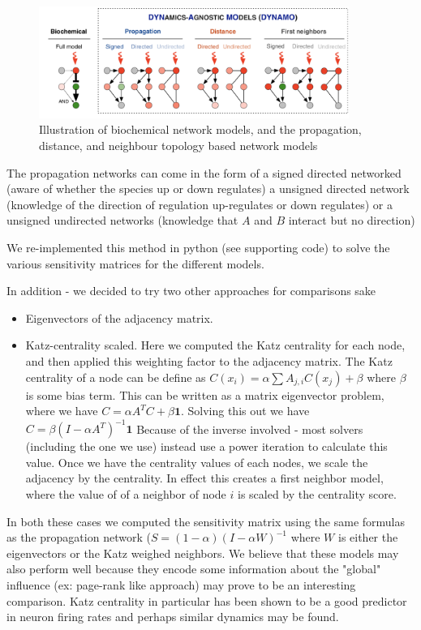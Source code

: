 \documentclass{article}
\begin{document}
\begin{figure}
    \includegraphics[width = 0.9\textwidth]{Images/dynamo.png}
    \caption{Illustration of biochemical network models, and the propagation, distance, and neighbour topology based network models}
    \label{fig:dynamo}
\end{figure}


The propagation networks can come in the form of a signed directed networked (aware of whether the species up or down regulates) a unsigned directed network (knowledge of the direction of regulation up-regulates or down regulates) or a unsigned undirected networks (knowledge that $A$ and $B$ interact but no direction)

We re-implemented this method in python (see supporting code) to solve the various sensitivity matrices for the different models.

In addition - we decided to try two other approaches for comparisons sake
\begin{itemize}
    \item Eigenvectors of the adjacency matrix. 
    \item Katz-centrality scaled. Here we computed the Katz centrality for each node, and then applied this weighting factor to the adjacency matrix. The Katz centrality of a node can be define as $C(x_i) = \alpha \sum A_{j, i} C(x_j) + \beta$ where $\beta$ is some bias term. This can be written as a matrix eigenvector problem, where we have $C = \alpha A^T C + \beta \textbf{1}$. Solving this out we have $C = \beta(I - \alpha A^T)^{-1} \textbf{1}$ Because of the inverse involved - most solvers (including the one we use) instead use a power iteration to calculate this value. Once we have the centrality values of each nodes, we scale the adjacency by the centrality. In effect this creates a first neighbor model, where the value of of a neighbor of node $i$ is scaled by the centrality score. 
\end{itemize}

In both these cases we computed the sensitivity matrix using the same formulas as the propagation network ($S = (1 - \alpha)(I - \alpha W)^{-1}$ where $W$ is either the eigenvectors or the Katz weighed neighbors. We believe that these models may also perform well because they encode some information about the "global" influence (ex: page-rank like approach) may prove to be an interesting comparison. Katz centrality in particular has been shown to be a good predictor in neuron firing rates and perhaps similar dynamics may be found. ~\cite{doi:10.1142/S0129065717500137}
 
\end{document}
